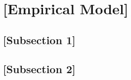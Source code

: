 \section{[Empirical Model]}
\label{sec:EMP}

\subsection{[Subsection 1]}
\label{Emp:Pan}


\subsection{[Subsection 2]}
\label{Emp:TS}
